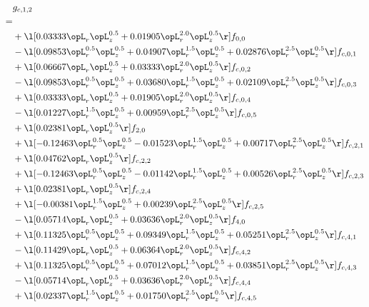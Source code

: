 \begin{alignat}{2} 
\label{eq:g_12_0} 
& g_{c,1,2} \nonumber \\ 
 = \\ 
& + \l[  0.03333 \opL_r \opL_z^{0.5} +  0.01905 \opL_r^{2.0} \opL_z^{0.5}  \r] f_{0,0} \nonumber \\ 
& - \l[  0.09853 \opL_r^{0.5} \opL_z^{0.5} +  0.04907 \opL_r^{1.5} \opL_z^{0.5} +  0.02876 \opL_r^{2.5} \opL_z^{0.5}  \r] f_{c,0,1} \nonumber \\ 
& + \l[  0.06667 \opL_r \opL_z^{0.5} +  0.03333 \opL_r^{2.0} \opL_z^{0.5}  \r] f_{c,0,2} \nonumber \\ 
& - \l[  0.09853 \opL_r^{0.5} \opL_z^{0.5} +  0.03680 \opL_r^{1.5} \opL_z^{0.5} +  0.02109 \opL_r^{2.5} \opL_z^{0.5}  \r] f_{c,0,3} \nonumber \\ 
& + \l[  0.03333 \opL_r \opL_z^{0.5} +  0.01905 \opL_r^{2.0} \opL_z^{0.5}  \r] f_{c,0,4} \nonumber \\ 
& - \l[  0.01227 \opL_r^{1.5} \opL_z^{0.5} +  0.00959 \opL_r^{2.5} \opL_z^{0.5}  \r] f_{c,0,5} \nonumber \\ 
& + \l[  0.02381 \opL_r \opL_z^{0.5}  \r] f_{2,0} \nonumber \\ 
& + \l[  -0.12463 \opL_r^{0.5} \opL_z^{0.5}   -0.01523 \opL_r^{1.5} \opL_z^{0.5} +  0.00717 \opL_r^{2.5} \opL_z^{0.5}  \r] f_{c,2,1} \nonumber \\ 
& + \l[  0.04762 \opL_r \opL_z^{0.5}  \r] f_{c,2,2} \nonumber \\ 
& + \l[  -0.12463 \opL_r^{0.5} \opL_z^{0.5}   -0.01142 \opL_r^{1.5} \opL_z^{0.5} +  0.00526 \opL_r^{2.5} \opL_z^{0.5}  \r] f_{c,2,3} \nonumber \\ 
& + \l[  0.02381 \opL_r \opL_z^{0.5}  \r] f_{c,2,4} \nonumber \\ 
& + \l[  -0.00381 \opL_r^{1.5} \opL_z^{0.5} +  0.00239 \opL_r^{2.5} \opL_z^{0.5}  \r] f_{c,2,5} \nonumber \\ 
& - \l[  0.05714 \opL_r \opL_z^{0.5} +  0.03636 \opL_r^{2.0} \opL_z^{0.5}  \r] f_{4,0} \nonumber \\ 
& + \l[  0.11325 \opL_r^{0.5} \opL_z^{0.5} +  0.09349 \opL_r^{1.5} \opL_z^{0.5} +  0.05251 \opL_r^{2.5} \opL_z^{0.5}  \r] f_{c,4,1} \nonumber \\ 
& - \l[  0.11429 \opL_r \opL_z^{0.5} +  0.06364 \opL_r^{2.0} \opL_z^{0.5}  \r] f_{c,4,2} \nonumber \\ 
& + \l[  0.11325 \opL_r^{0.5} \opL_z^{0.5} +  0.07012 \opL_r^{1.5} \opL_z^{0.5} +  0.03851 \opL_r^{2.5} \opL_z^{0.5}  \r] f_{c,4,3} \nonumber \\ 
& - \l[  0.05714 \opL_r \opL_z^{0.5} +  0.03636 \opL_r^{2.0} \opL_z^{0.5}  \r] f_{c,4,4} \nonumber \\ 
& + \l[  0.02337 \opL_r^{1.5} \opL_z^{0.5} +  0.01750 \opL_r^{2.5} \opL_z^{0.5}  \r] f_{c,4,5} \nonumber \\ 
\end{alignat} 


